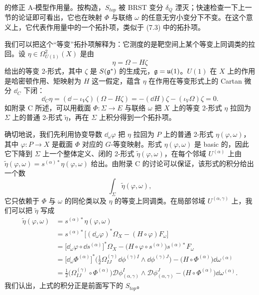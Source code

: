 的修正 A-模型作用量。按构造，$S_{top}$ 被 BRST 变分 $\delta_Q$ 湮灭；快速检查一下上一节的论证即可看出，它也在映射 $\Phi$ 与联络 $\omega$ 的任意无穷小变分下不变。在这个意义上，它代表作用量中的一个拓扑项，类似于 (7.3) 中的拓扑项。

我们可以把这个“等变”拓扑项解释为：它测度的是靶空间上某个等变上同调类的拉回。设 $\eta\in\Omega^2_{U(1)}(X)$ 是由
\[
\eta=\Omega-H\zeta
\]
给出的等变 2-形式，其中 $\zeta$ 是 $S(\mathfrak{g}^*)$ 的生成元，$\mathfrak{g}=\mathfrak{u}(1)$。$U(1)$ 在 $X$ 上的作用是哈密顿作用、矩映射为 $H$ 这一假定，蕴含 $\eta$ 在作用在等变形式上的 Cartan 微分 $\dd_C$ 下闭：
\[
\dd_C\eta=(\dd-\iota_V\zeta)(\Omega-H\zeta)=-(\dd H)\zeta-(\iota_V\Omega)\zeta=0 .
\]
如附录 C 所述，可以用截面 $\Phi:\Sigma\to E$ 与联络 $\omega$ 把 $X$ 上的等变 2-形式 $\eta$ 拉回为 $\Sigma$ 上的普通 2-形式 $\tilde\eta$，再在 $\Sigma$ 上积分得到一个拓扑项。

确切地说，我们先利用协变导数 $\dd_\omega\varphi$ 把 $\eta$ 拉回为 $P$ 上的普通 2-形式 $\eta(\varphi,\omega)$，其中 $\varphi:P\to X$ 是截面 $\Phi$ 对应的 $G$-等变映射。形式 $\eta(\varphi,\omega)$ 是 basic 的，因此它下降到 $\Sigma$ 上一个整体定义、闭的 2-形式 $\tilde\eta(\varphi,\omega)$，在每个邻域 $U^{(\alpha)}$ 上由 $\tilde\eta(\varphi,\omega)=s^{(\alpha)*}\eta(\varphi,\omega)$ 给出。由附录 C 的讨论可以保证，该形式的积分给出一个数
\[
\int_\Sigma\tilde\eta(\varphi,\omega),
\]
它只依赖于 $\Phi$ 与 $\omega$ 的同伦类以及 $\eta$ 的等变上同调类。在局部邻域 $U^{(\alpha,\gamma)}$ 上，我们可以把 $\tilde\eta$ 写成
\begin{align*}
\tilde\eta(\varphi,\omega)&=s^{(\alpha)*}\eta(\varphi,\omega)\\
&=s^{(\alpha)*}\Big[(\dd_\omega\varphi)^*\Omega_X-(H\circ\varphi)F_\omega\Big]\\
&=\big[\dd_\omega\varphi\circ\dd s^{(\alpha)}\big]^*\Omega_X-\big(H\circ\varphi\circ s^{(\alpha)}\big)s^{(\alpha)*}F_\omega\\
&=\big[\dd_\omega\Phi^{(\alpha)}\big]^*\Big(\frac12\Omega^{(\gamma)}_{IJ}\dd\phi^{(\gamma)I}\wedge\dd\phi^{(\gamma)J}\Big)-\big(H\circ\Phi^{(\alpha)}\big)\dd\omega^{(\alpha)}\\
&=\frac12\big(\Omega^{(\gamma)}_{IJ}\circ\Phi^{(\alpha)}\big)\mathcal{D}\phi^I_{(\alpha,\gamma)}\wedge\mathcal{D}\phi^J_{(\alpha,\gamma)}-\big(H\circ\Phi^{(\alpha)}\big)\dd\omega^{(\alpha)} .
\end{align*}
我们认出，上式的积分正是前面写下的 $S_{top}$。

